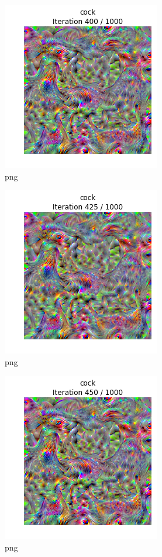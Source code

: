 \documentclass[]{book}
\theoremstyle{definition}
\theoremstyle{definition}
\theoremstyle{definition}
\theoremstyle{remark}
\begin{document}
\begin{figure}
\centering
\includegraphics{Network-Visualization-TensorFlow_files/Network-Visualization-TensorFlow_22_16.png}
\caption{png}
\end{figure}

\begin{figure}
\centering
\includegraphics{Network-Visualization-TensorFlow_files/Network-Visualization-TensorFlow_22_17.png}
\caption{png}
\end{figure}

\begin{figure}
\centering
\includegraphics{Network-Visualization-TensorFlow_files/Network-Visualization-TensorFlow_22_18.png}
\caption{png}
\end{figure}
\end{document}
